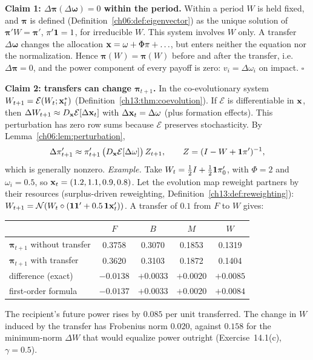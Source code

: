 \documentclass[../solutions_manual.tex]{subfiles}
\begin{document}
\textbf{Claim 1: $\Delta\boldsymbol{\pi}(\Delta\boldsymbol{\omega}) = 0$ within the period.} Within a period $W$ is held fixed, and $\boldsymbol{\pi}$ is defined (Definition~\ref{ch06:def:eigenvector}) as the unique solution of $\boldsymbol{\pi}'W = \boldsymbol{\pi}'$, $\pi'\mathbf{1} = 1$, for irreducible $W$. This system involves $W$ only. A transfer $\Delta\boldsymbol{\omega}$ changes the allocation $\mathbf{x} = \omega + \Phi\pi + \ldots$, but enters neither the equation nor the normalization. Hence $\boldsymbol{\pi}(W) = \boldsymbol{\pi}(W)$ before and after the transfer, i.e.\ $\Delta\boldsymbol{\pi} = 0$, and the power component of every payoff is zero: $v_i = \Delta\omega_i$ on impact. $\square$

\textbf{Claim 2: transfers can change $\boldsymbol{\pi}_{t+1}$.} In the co-evolutionary system $W_{t+1} = \mathcal{E}(W_t; \mathbf{x}^*_t)$ (Definition~\ref{ch13:thm:coevolution}). If $\mathcal{E}$ is differentiable in $\mathbf{x}$, then $\Delta W_{t+1} \approx D_{\mathbf{x}}\mathcal{E}[\Delta\mathbf{x}_t]$ with $\Delta\mathbf{x}_t = \Delta\omega$ (plus formation effects). This perturbation has zero row sums because $\mathcal{E}$ preserves stochasticity. By Lemma~\ref{ch06:lem:perturbation},
\[
\Delta\pi_{t+1}' \approx \pi_{t+1}'\,\big(D_{\mathbf{x}}\mathcal{E}[\Delta\omega]\big)\,Z_{t+1}, \qquad Z = (I - W + \mathbf{1}\pi')^{-1},
\]
which is generally nonzero. \emph{Example.} Take $W_t = \tfrac12 I + \tfrac12\mathbf{1}\pi_0'$, with $\Phi = 2$ and $\omega_i = 0.5$, so $\mathbf{x}_t = (1.2, 1.1, 0.9, 0.8)$. Let the evolution map reweight partners by their resources (surplus-driven reweighting, Definition~\ref{ch13:def:reweighting}): $W_{t+1} = \mathcal{N}(W_t \circ (\mathbf{1}\mathbf{1}' + 0.5\,\mathbf{1}\mathbf{x}_t'))$. A transfer of $0.1$ from $F$ to $W$ gives:
\begin{center}
\begin{tabular}{lcccc}
\toprule
& $F$ & $B$ & $M$ & $W$ \\
\midrule
$\boldsymbol{\pi}_{t+1}$ without transfer & 0.3758 & 0.3070 & 0.1853 & 0.1319 \\
$\boldsymbol{\pi}_{t+1}$ with transfer & 0.3620 & 0.3103 & 0.1872 & 0.1404 \\
difference (exact) & $-0.0138$ & $+0.0033$ & $+0.0020$ & $+0.0085$ \\
first-order formula & $-0.0137$ & $+0.0033$ & $+0.0020$ & $+0.0084$ \\
\bottomrule
\end{tabular}
\end{center}
The recipient's future power rises by $0.085$ per unit transferred. The change in $W$ induced by the transfer has Frobenius norm $0.020$, against $0.158$ for the minimum-norm $\Delta W$ that would equalize power outright (Exercise~14.1(c), $\gamma = 0.5$).
\end{document}
